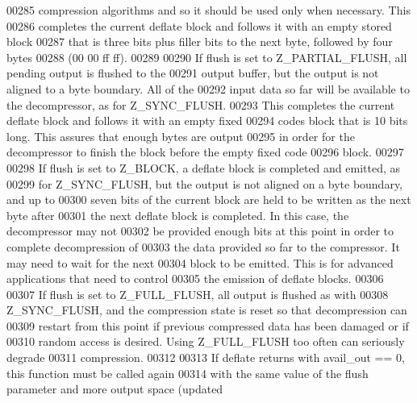 \begin{DoxyCode}
00285 \textcolor{comment}{  compression algorithms and so it should be used only when necessary.  This}
00286 \textcolor{comment}{  completes the current deflate block and follows it with an empty stored block}
00287 \textcolor{comment}{  that is three bits plus filler bits to the next byte, followed by four bytes}
00288 \textcolor{comment}{  (00 00 ff ff).}
00289 \textcolor{comment}{}
00290 \textcolor{comment}{    If flush is set to Z\_PARTIAL\_FLUSH, all pending output is flushed to the}
00291 \textcolor{comment}{  output buffer, but the output is not aligned to a byte boundary.  All of the}
00292 \textcolor{comment}{  input data so far will be available to the decompressor, as for Z\_SYNC\_FLUSH.}
00293 \textcolor{comment}{  This completes the current deflate block and follows it with an empty fixed}
00294 \textcolor{comment}{  codes block that is 10 bits long.  This assures that enough bytes are output}
00295 \textcolor{comment}{  in order for the decompressor to finish the block before the empty fixed code}
00296 \textcolor{comment}{  block.}
00297 \textcolor{comment}{}
00298 \textcolor{comment}{    If flush is set to Z\_BLOCK, a deflate block is completed and emitted, as}
00299 \textcolor{comment}{  for Z\_SYNC\_FLUSH, but the output is not aligned on a byte boundary, and up to}
00300 \textcolor{comment}{  seven bits of the current block are held to be written as the next byte after}
00301 \textcolor{comment}{  the next deflate block is completed.  In this case, the decompressor may not}
00302 \textcolor{comment}{  be provided enough bits at this point in order to complete decompression of}
00303 \textcolor{comment}{  the data provided so far to the compressor.  It may need to wait for the next}
00304 \textcolor{comment}{  block to be emitted.  This is for advanced applications that need to control}
00305 \textcolor{comment}{  the emission of deflate blocks.}
00306 \textcolor{comment}{}
00307 \textcolor{comment}{    If flush is set to Z\_FULL\_FLUSH, all output is flushed as with}
00308 \textcolor{comment}{  Z\_SYNC\_FLUSH, and the compression state is reset so that decompression can}
00309 \textcolor{comment}{  restart from this point if previous compressed data has been damaged or if}
00310 \textcolor{comment}{  random access is desired.  Using Z\_FULL\_FLUSH too often can seriously degrade}
00311 \textcolor{comment}{  compression.}
00312 \textcolor{comment}{}
00313 \textcolor{comment}{    If deflate returns with avail\_out == 0, this function must be called again}
00314 \textcolor{comment}{  with the same value of the flush parameter and more output space (updated}

\end{DoxyCode}
